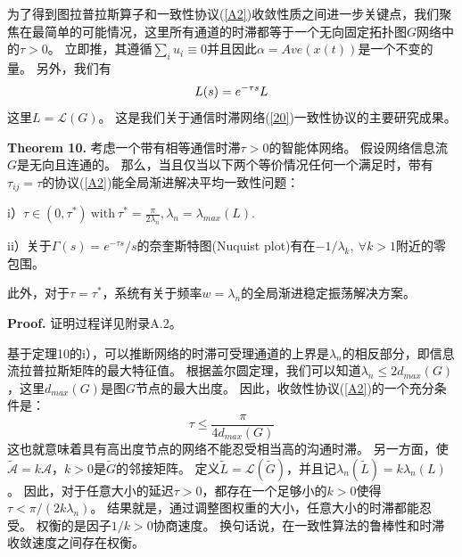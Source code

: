 \documentclass{article}
\begin{document}
为了得到图拉普拉斯算子和一致性协议(\ref{A2})收敛性质之间进一步关键点，我们聚焦在最简单的可能情况，这里所有通道的时滞都等于一个无向固定拓扑图$G$网络中的$\tau > 0$。
立即推，其遵循$\sum_i u_i \equiv 0$并且因此$\alpha = Ave(x(t))$是一个不变的量。
另外，我们有
\begin{equation}
    L(s) = e^{-\tau s}L
    \notag
\end{equation}
这里$L=\mathcal{L}(G)$。
这是我们关于通信时滞网络(\ref{20})一致性协议的主要研究成果。

\noindent \textbf{Theorem 10.} 考虑一个带有相等通信时滞$\tau > 0$的智能体网络。
假设网络信息流$G$是无向且连通的。
那么，当且仅当以下两个等价情况任何一个满足时，带有$\tau_{ij} = \tau$的协议(\ref{A2})能全局渐进解决平均一致性问题：

i）$\tau \in (0, \tau^*)\ \text{with}\ \tau^*=\frac{\pi}{2\lambda_n}, \lambda_n=\lambda_{max}(L)$.

ii）关于$\Gamma(s) = e^{-\tau s}/s$的奈奎斯特图(Nuquist plot)有在$-1/\lambda_k,\ \forall k > 1$附近的零包围。

此外，对于$\tau=\tau^*$，系统有关于频率$w=\lambda_n$的全局渐进稳定振荡解决方案。

\noindent \textbf{Proof.} 证明过程详见附录A.2。

基于定理10的i），可以推断网络的时滞可受理通道的上界是$\lambda_n$的相反部分，即信息流拉普拉斯矩阵的最大特征值。
根据盖尔圆定理，我们可以知道$\lambda_n\le 2d_{max}(G)$，这里$d_{max}(G)$是图$G$节点的最大出度。
因此，收敛性协议(\ref{A2})的一个充分条件是：
\begin{equation}
    \tau \le \frac{\pi}{4d_{max}(G)}
    \tag{40}
    \label{40}
\end{equation}
这也就意味着具有高出度节点的网络不能忍受相当高的沟通时滞。
另一方面，使$\tilde{\mathcal{A}}=k\mathcal{A}$，$k>0$是$\tilde{G}$的邻接矩阵。
定义$\tilde{L}=\mathcal{L}(\tilde{G})$，并且记$\lambda_n(\tilde{L}) = k\lambda_n(L)$。
因此，对于任意大小的延迟$\tau>0$，都存在一个足够小的$k>0$使得$\tau < \pi/(2k\lambda_n)$。
结果就是，通过调整图权重的大小，任意大小的时滞都能忍受。
权衡的是因子$1/k>0$协商速度。
换句话说，在一致性算法的鲁棒性和时滞收敛速度之间存在权衡。

\end{document}
